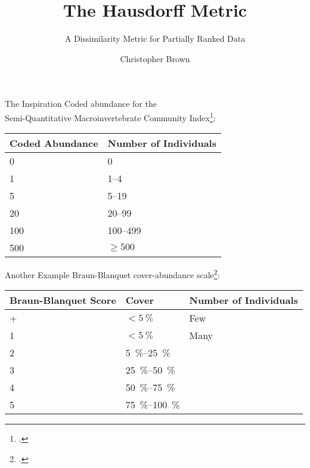 \documentclass[pdf,usenames,dvipsnames,tikz]{beamer}%
\title{The Hausdorff Metric}
\subtitle{A Dissimilarity Metric for Partially Ranked Data}
\author{Christopher Brown}
\date{}
\begin{document}
\begin{frame}
	\titlepage
\end{frame}

\begin{frame}{The Inspiration}
	Coded abundance for the\\Semi-Quantitative Macroinvertebrate Community Index\footcite{sqmci}:
	
	\medskip
	
	\begin{tabular}{ll}
		\toprule
		Coded Abundance & Number of Individuals\\
		\midrule
		0 & 0\\
		1 & 1--4\\
		5 & 5--19\\
		20 & 20--99\\
		100 & 100--499\\
		500 & $\geq500$\\
		\bottomrule
	\end{tabular}
\end{frame}

\begin{frame}{Another Example}
	Braun-Blanquet cover-abundance scale\footcite{braun-blanquet}:
	
	\medskip
	
	\begin{tabular}{lll}
		\toprule
		Braun-Blanquet Score & Cover & Number of Individuals\\
		\midrule
		+ & $<\SI{5}{\percent}$ & Few\\
		1 & $<\SI{5}{\percent}$ & Many\\
		2 & \SIrange{5}{25}{\percent}\\
		3 & \SIrange{25}{50}{\percent}\\
		4 & \SIrange{50}{75}{\percent}\\
		5 & \SIrange{75}{100}{\percent}\\
		\bottomrule
	\end{tabular}
\end{frame}

\begin{frame}
	\printbibliography
\end{frame}
\end{document}

